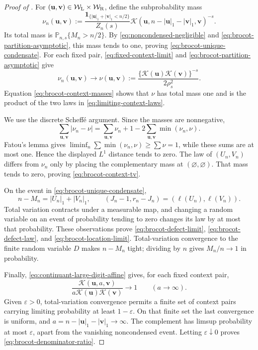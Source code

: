 \begin{proof}[Proof of ]
For \((\mathbf u,\mathbf v)\in
\mathcal W_{\rm L}\times\mathcal W_{\rm R}\), define the subprobability
mass
\[
 \nu_n(\mathbf u,\mathbf v):=
 \frac{\mathbf1_{\{|\mathbf u|_1+|\mathbf v|_1<n/2\}}}{Z_n(s)}
 \mathcal K(\mathbf u,
 n-|\mathbf u|_1-|\mathbf v|_1,\mathbf v)^{-s}.
\]
Its total mass is \(\mathbb P_{n,s}\{M_n>n/2\}\).  By
\eqref{eq:noncondensed-negligible} and
\eqref{eq:brocot-partition-asymptotic}, this mass tends to one, proving
\eqref{eq:brocot-unique-condensate}.  For each fixed pair,
\eqref{eq:fixed-context-limit} and
\eqref{eq:brocot-partition-asymptotic} give
\[
 \nu_n(\mathbf u,\mathbf v)\longrightarrow
 \nu(\mathbf u,\mathbf v):=
 \frac{\{\mathcal K(\mathbf u)\mathcal K(\mathbf v)\}^{-s}}
      {2\rho_s^2}.
\]
Equation \eqref{eq:brocot-context-masses} shows that \(\nu\) has total mass
one and is the product of the two laws in
\eqref{eq:limiting-context-laws}.

We use the discrete Scheff\'e argument.  Since the masses are nonnegative,
\[
 \sum_{\mathbf u,\mathbf v}|\nu_n-\nu|
 =\sum_{\mathbf u,\mathbf v}\nu_n+1
  -2\sum_{\mathbf u,\mathbf v}\min(\nu_n,\nu).
\]
Fatou's lemma gives
\(\liminf_n\sum\min(\nu_n,\nu)\ge\sum\nu=1\), while these sums are at most
one.  Hence the displayed \(L^1\) distance tends to zero.  The law of
\((U_n,V_n)\) differs from \(\nu_n\) only by placing the complementary
mass at \((\varnothing,\varnothing)\).  That mass tends to zero, proving
\eqref{eq:brocot-context-tv}.

On the event in \eqref{eq:brocot-unique-condensate},
\[
 n-M_n=|U_n|_1+|V_n|_1,
 \qquad
 (J_n-1,r_n-J_n)=(\ell(U_n),\ell(V_n)).
\]
Total variation contracts under a measurable map, and changing a random
variable on an event of probability tending to zero changes its law by at
most that probability.  These observations prove
\eqref{eq:brocot-defect-limit}, \eqref{eq:brocot-defect-law}, and
\eqref{eq:brocot-location-limit}.  Total-variation convergence to the
finite random variable \(D\) makes \(n-M_n\) tight; dividing by \(n\) gives
\(M_n/n\to1\) in probability.

Finally, \eqref{eq:continuant-large-digit-affine} gives, for each fixed
context pair,
\[
 \frac{\mathcal K(\mathbf u,a,\mathbf v)}
      {a\mathcal K(\mathbf u)\mathcal K(\mathbf v)}\longrightarrow1
 \qquad(a\to\infty).
\]
Given \(\varepsilon>0\), total-variation convergence permits a finite set
of context pairs carrying limiting probability at least \(1-\varepsilon\).
On that finite set the last convergence is uniform, and
\(a=n-|\mathbf u|_1-|\mathbf v|_1\to\infty\).  The complement has
limsup probability at most \(\varepsilon\), apart from the vanishing
noncondensed event.  Letting \(\varepsilon\downarrow0\) proves
\eqref{eq:brocot-denominator-ratio}.
\end{proof}
